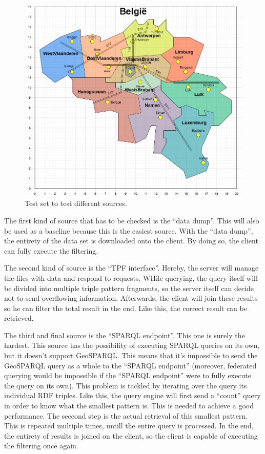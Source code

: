 \documentclass[twocolumn]{phdsymp} %
\begin{document}
\begin{figure}
    \centering
    \includegraphics[width=\linewidth]{images/geosparql_demo.png}
    \caption{Test set to test different sources.}
    \label{fig:abstr_demoset}
\end{figure}

The first kind of source that has to be checked is the ``data dump''. This will also be used as a baseline because this is the easiest source. With the ``data dump'', the entirety of the data set is downloaded onto the client. By doing so, the client can fully execute the filtering.

The second kind of source is the ``TPF interface''. Hereby, the server will manage the files with data and respond to requests. WHile querying, the query itself will be divided into multiple triple pattern fragments, so the server itself can decide not to send overflowing information. Afterwards, the client will join these results so he can filter the total result in the end. Like this, the correct result can be retrieved.

The third and final source is the ``SPARQL endpoint''. This one is surely the hardest. This source has the possibility of executing SPARQL queries on its own, but it doesn't support GeoSPARQL. This means that it's impossible to send the GeoSPARQL query as a whole to the ``SPARQL endpoint'' (moreover, federated querying would be impossible if the ``SPARQL endpoint'' were to fully execute the query on its own). This problem is tackled by iterating over the query its individual RDF triples. Like this, the query engine will first send a ``count'' query in order to know what the smallest pattern is. This is needed to achieve a good performance. The seccond step is the actual retrieval of this smallest pattern. This is repeated multiple times, untill the entire query is processed. In the end, the entirety of results is joined on the client, so the client is capable of executing the filtering once again.
\end{document}
